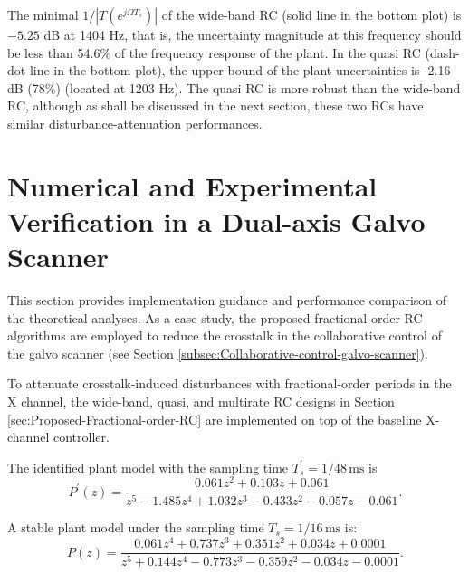 \documentclass [11pt, proquest] {uwthesis}[2020/02/24]
\begin{document}
The minimal $1/|T(e^{j\Omega T_{s}})|$ of the wide-band RC (solid
line in the bottom plot) is $-5.25$ dB at 1404 Hz, that is, the uncertainty
magnitude at this frequency should be less than 54.6\% of the frequency
response of the plant. In the quasi RC (dash-dot line in the bottom
plot), the upper bound of the plant uncertainties is -2.16 dB (78\%)
(located at 1203 Hz). The quasi RC is more robust than the wide-band
RC, although as shall be discussed in the next section, these two
RCs have similar disturbance-attenuation performances. 

\section{Numerical and Experimental Verification in a Dual-axis Galvo Scanner} \label{sec:Verification-Galvo-Scanner}

This section provides implementation guidance and performance comparison
of the theoretical analyses. As a case study, the proposed fractional-order
RC algorithms are employed to reduce the crosstalk in the collaborative
control of the galvo scanner (see Section \ref{subsec:Collaborative-control-galvo-scanner}).

To attenuate crosstalk-induced disturbances with fractional-order
periods in the X channel, the wide-band, quasi, and multirate RC designs
in Section \ref{sec:Proposed-Fractional-order-RC} are implemented on top of the baseline
X-channel controller.

The identified plant model with the sampling time $T_{s}^{'}=1/48\,\text{ms}$
is
\begin{equation}
P^{'}(z)=\frac{0.061z^{2}+0.103z+0.061}{z^{5}-1.485z^{4}+1.032z^{3}-0.433z^{2}-0.057z-0.061}.\label{eq:P_z}
\end{equation}

A stable plant model under the sampling time $T_{s}=1/16\,\text{ms}$
is:
\begin{equation}
P(z)=\frac{0.061z^{4}+0.737z^{3}+0.351z^{2}+0.034z+0.0001}{z^{5}+0.144z^{4}-0.773z^{3}-0.359z^{2}-0.034z-0.0001}.\label{eq:P_z-1}
\end{equation}
\end{document}
